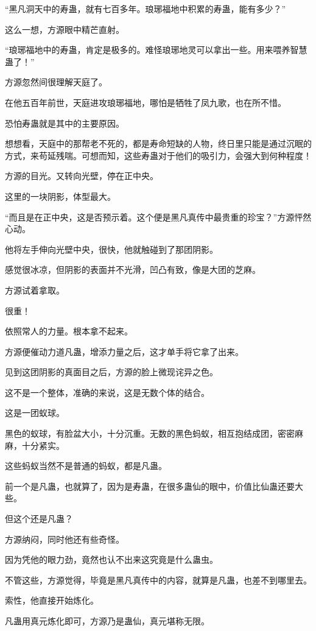 \begin{this_body}
“黑凡洞天中的寿蛊，就有七百多年。琅琊福地中积累的寿蛊，能有多少？”

这么一想，方源眼中精芒直射。

“琅琊福地中的寿蛊，肯定是极多的。难怪琅琊地灵可以拿出一些。用来喂养智慧蛊了！”

方源忽然间很理解天庭了。

在他五百年前世，天庭进攻琅琊福地，哪怕是牺牲了凤九歌，也在所不惜。

恐怕寿蛊就是其中的主要原因。

想想看，天庭中的那帮老不死的，都是寿命短缺的人物，终日里只能是通过沉眠的方式，来苟延残喘。可想而知，这些寿蛊对于他们的吸引力，会强大到何种程度！

方源的目光。又转向光壁，停在正中央。

这里的一块阴影，体型最大。

“而且是在正中央，这是否预示着。这个便是黑凡真传中最贵重的珍宝？”方源怦然心动。

他将左手伸向光壁中央，很快，他就触碰到了那团阴影。

感觉很冰凉，但阴影的表面并不光滑，凹凸有致，像是大团的芝麻。

方源试着拿取。

很重！

依照常人的力量。根本拿不起来。

方源便催动力道凡蛊，增添力量之后，这才单手将它拿了出来。

见到这团阴影的真面目之后，方源的脸上微现诧异之色。

这不是一个整体，准确的来说，这是无数个体的结合。

这是一团蚁球。

黑色的蚁球，有脸盆大小，十分沉重。无数的黑色蚂蚁，相互抱结成团，密密麻麻，十分紧实。

这些蚂蚁当然不是普通的蚂蚁，都是凡蛊。

前一个是凡蛊，也就算了，因为是寿蛊，在很多蛊仙的眼中，价值比仙蛊还要大些。

但这个还是凡蛊？

方源纳闷，同时他还有些奇怪。

因为凭他的眼力劲，竟然也认不出来这究竟是什么蛊虫。

不管这些，方源觉得，毕竟是黑凡真传中的内容，就算是凡蛊，也差不到哪里去。

索性，他直接开始炼化。

凡蛊用真元炼化即可，方源乃是蛊仙，真元堪称无限。


\end{this_body}
